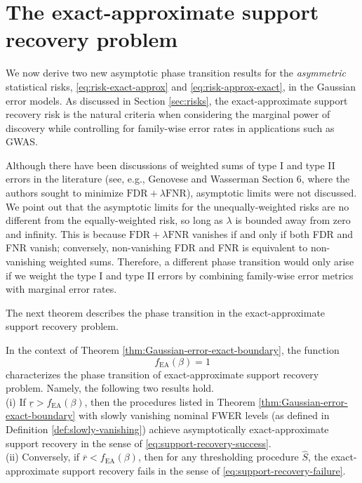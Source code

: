 \section{The exact-approximate support recovery problem}
\label{subsec:exact-approx-support-recovery-Gaussian}

We now derive two new asymptotic phase transition results for the \emph{asymmetric} statistical risks, \eqref{eq:risk-exact-approx} and \eqref{eq:risk-approx-exact}, in the Gaussian error models.
As discussed in Section \ref{sec:risks}, the exact-approximate support recovery risk is the natural criteria when considering the marginal power of discovery while controlling for family-wise error rates in applications such as GWAS.

Although there have been discussions of weighted sums of type I and type II errors in the literature (see, e.g., Genovese and Wasserman \citep{genovese2002operating} Section 6, where the authors sought to minimize $\textrm{FDR} + \lambda\textrm{FNR}$), asymptotic limits were not discussed.
We point out that the asymptotic limits for the unequally-weighted risks are no different from the equally-weighted risk, so long as $\lambda$ is bounded away from zero and infinity.
This is because $\textrm{FDR} + \lambda\textrm{FNR}$ vanishes if and only if both FDR and FNR vanish; conversely, non-vanishing FDR and FNR is equivalent to non-vanishing weighted sums.
Therefore, a different phase transition would only arise if we weight the type I and type II errors by combining family-wise error metrics with marginal error rates.

The next theorem describes the phase transition in the exact-approximate support recovery problem.

\begin{theorem} \label{thm:Gaussian-error-exact-approx-boundary}
In the context of Theorem \ref{thm:Gaussian-error-exact-boundary}, the function 
\begin{equation} \label{eq:exact-approx-boundary-Gaussian}
    f_{\mathrm{EA}}(\beta) = 1
\end{equation}
characterizes the phase transition of exact-approximate support recovery problem.  Namely, the following two results hold.\\

{\rm (i)} If $\underline{r} > f_{\mathrm{EA}}(\beta)$, then the procedures listed in Theorem \ref{thm:Gaussian-error-exact-boundary} with slowly vanishing nominal FWER levels (as defined in Definition \ref{def:slowly-vanishing}) achieve asymptotically exact-approximate support recovery in the sense of \eqref{eq:support-recovery-success}. \\

{\rm (ii)} Conversely, if $\overline{r} < f_{\mathrm{EA}}(\beta)$, then for any thresholding procedure $\widehat{S}$, the exact-approximate support recovery fails in the sense of \eqref{eq:support-recovery-failure}.
\end{theorem}

